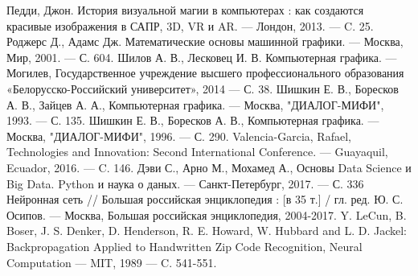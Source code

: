 
\renewcommand\bibname{Список использованных источников}
\begin{thebibliography}{3}
Педди, Джон. История визуальной магии в компьютерах : как создаются красивые изображения в САПР, 3D, VR и AR. --- Лондон, 2013. --- C. 25.
Роджерс Д., Адамс Дж. Математические основы машинной графики. --- Москва, Мир, 2001. --- С. 604.
Шилов А. В., Лесковец И. В. Компьютерная графика. --- Могилев, Государственное учреждение высшего профессионального образования «Белорусско-Российский университет», 2014 --- С. 38.
Шишкин Е. В., Боресков А. В., Зайцев А. А., Компьютерная графика. --- Москва, "ДИАЛОГ-МИФИ", 1993. --- С. 135.
Шишкин Е. В., Боресков А. В., Компьютерная графика. --- Москва, "ДИАЛОГ-МИФИ", 1996. --- С. 290.
Valencia-Garcia, Rafael, Technologies and Innovation: Second International Conference. --- Guayaquil, Ecuador, 2016. --- C. 146.
Дэви С., Арно М., Мохамед А., Основы Data Science и Big Data. Python и наука о даных. --- Санкт-Петербург, 2017. --- С. 336
Нейронная сеть // Большая российская энциклопедия : [в 35 т.] / гл. ред. Ю. С. Осипов. --- Москва, Большая российская энциклопедия, 2004-2017.
Y. LeCun, B. Boser, J. S. Denker, D. Henderson, R. E. Howard, W. Hubbard and L. D. Jackel: Backpropagation Applied to Handwritten Zip Code Recognition, Neural Computation --- MIT, 1989 --- C. 541-551.
\end{thebibliography}